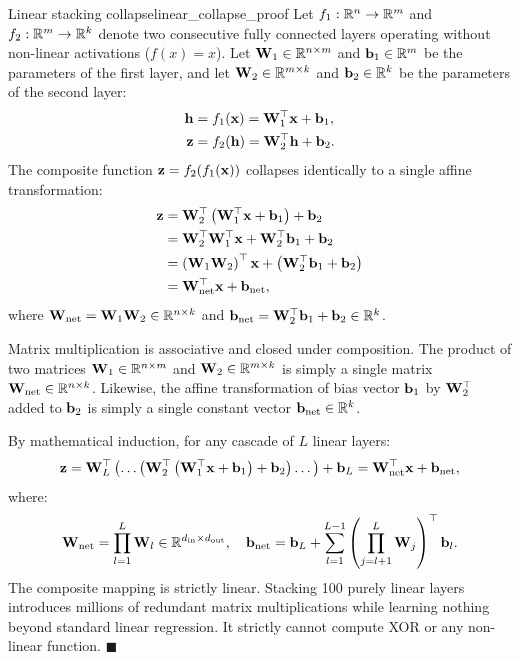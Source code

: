 \documentclass[../../main.tex]{subfiles}
\begin{document}
\begin{theorem}{Linear stacking collapse}{linear_collapse_proof}
Let $f_1: \mathbb{R}^n \to \mathbb{R}^m$ and $f_2: \mathbb{R}^m \to \mathbb{R}^k$ denote two consecutive fully connected layers operating without non-linear activations ($f(x) = x$). Let $\mathbf{W}_1 \in \mathbb{R}^{n \times m}$ and $\mathbf{b}_1 \in \mathbb{R}^m$ be the parameters of the first layer, and let $\mathbf{W}_2 \in \mathbb{R}^{m \times k}$ and $\mathbf{b}_2 \in \mathbb{R}^k$ be the parameters of the second layer:
\begin{align}
\mathbf{h} &= f_1(\mathbf{x}) = \mathbf{W}_1^\top \mathbf{x} + \mathbf{b}_1, \label{eq:collapse_layer1} \\
\mathbf{z} &= f_2(\mathbf{h}) = \mathbf{W}_2^\top \mathbf{h} + \mathbf{b}_2. \label{eq:collapse_layer2}
\end{align}
The composite function $\mathbf{z} = f_2(f_1(\mathbf{x}))$ collapses identically to a single affine transformation:
\begin{align}
\mathbf{z} &= \mathbf{W}_2^\top \left( \mathbf{W}_1^\top \mathbf{x} + \mathbf{b}_1 \right) + \mathbf{b}_2 \notag \\
&= \mathbf{W}_2^\top \mathbf{W}_1^\top \mathbf{x} + \mathbf{W}_2^\top \mathbf{b}_1 + \mathbf{b}_2 \notag \\
&= \left( \mathbf{W}_1 \mathbf{W}_2 \right)^\top \mathbf{x} + \left( \mathbf{W}_2^\top \mathbf{b}_1 + \mathbf{b}_2 \right) \notag \\
&= \mathbf{W}_{\text{net}}^\top \mathbf{x} + \mathbf{b}_{\text{net}}, \label{eq:collapse_final}
\end{align}
where $\mathbf{W}_{\text{net}} = \mathbf{W}_1 \mathbf{W}_2 \in \mathbb{R}^{n \times k}$ and $\mathbf{b}_{\text{net}} = \mathbf{W}_2^\top \mathbf{b}_1 + \mathbf{b}_2 \in \mathbb{R}^k$.
\end{theorem}

Matrix multiplication is associative and closed under composition. The product of two matrices $\mathbf{W}_1 \in \mathbb{R}^{n \times m}$ and $\mathbf{W}_2 \in \mathbb{R}^{m \times k}$ is simply a single matrix $\mathbf{W}_{\text{net}} \in \mathbb{R}^{n \times k}$. Likewise, the affine transformation of bias vector $\mathbf{b}_1$ by $\mathbf{W}_2^\top$ added to $\mathbf{b}_2$ is simply a single constant vector $\mathbf{b}_{\text{net}} \in \mathbb{R}^k$. 

By mathematical induction, for any cascade of $L$ linear layers:
\begin{equation}
\label{eq:induction_collapse}
\mathbf{z} = \mathbf{W}_L^\top \left( \dots \left( \mathbf{W}_2^\top \left( \mathbf{W}_1^\top \mathbf{x} + \mathbf{b}_1 \right) + \mathbf{b}_2 \right) \dots \right) + \mathbf{b}_L = \mathbf{W}_{\text{net}}^\top \mathbf{x} + \mathbf{b}_{\text{net}},
\end{equation}
where:
\begin{equation}
\mathbf{W}_{\text{net}} = \prod_{l=1}^L \mathbf{W}_l \in \mathbb{R}^{d_{\text{in}} \times d_{\text{out}}}, \quad \mathbf{b}_{\text{net}} = \mathbf{b}_L + \sum_{l=1}^{L-1} \left( \prod_{j=l+1}^L \mathbf{W}_j \right)^\top \mathbf{b}_l.
\end{equation}
The composite mapping is strictly linear. Stacking 100 purely linear layers introduces millions of redundant matrix multiplications while learning nothing beyond standard linear regression. It strictly cannot compute XOR or any non-linear function. \hfill $\blacksquare$
\end{document}
